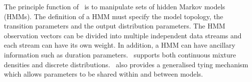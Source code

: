 %
%


The principle function of \HTK\ is to manipulate sets of hidden
Markov  models (HMMs). The definition of a HMM must specify the
model topology, the transition parameters and the output
distribution parameters. The HMM observation vectors can be
divided into multiple independent data streams and each stream can
have its own weight. In addition, a HMM can have ancillary
information such as duration parameters.
\HTK\ supports both continuous mixture densities and discrete
distributions. \HTK\ also provides a generalised tying mechanism which
allows parameters to be shared within and between models.  

